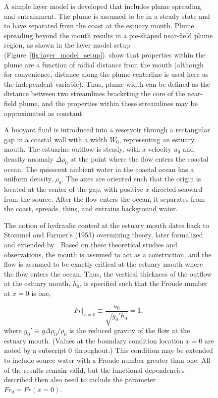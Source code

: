 \documentclass[11pt]{report}
\numberwithin{equation}{section}
\begin{document}
\begin{figure}
A simple layer model is developed that includes plume spreading and entrainment.  The plume is assumed to be in a steady state and to have separated from the coast at the estuary mouth.  Plume spreading beyond the mouth results in a pie-shaped near-field plume region, as shown in the layer model setup (Figure~\ref{fig:layer_model_setup}).  \citet{hetland.macdonald:08} show that properties within the plume are a function of radial distance from the mouth (although for convenience, distance along the plume centerline is used here as the independent variable).  Thus,  plume width can be defined as the distance between two streamlines bracketing the core of the near-field plume, and the properties within these streamlines may be approximated as constant.

A buoyant fluid is introduced into a reservoir through a rectangular gap in a coastal wall with a width $W_0$, representing an estuary mouth.  The estuarine outflow is steady, with a velocity $u_0$ and density anomaly $\Delta\rho_0$ at the point where the flow enters the coastal ocean.  The quiescent ambient water in the coastal ocean has a uniform density, $\rho_0$.  The axes are oriented such that the origin is located at the center of the gap, with positive $x$ directed seaward from the source.  After the flow enters the ocean, it separates from the coast, spreads, thins, and entrains background water.

The notion of hydraulic control at the estuary mouth dates back to Stommel and Farmer's (1953) overmixing theory, later formalized and extended by \citet{armi.farmer:86}.\nocite{stommel.farmer:53}  Based on these theoretical studies and observations, the mouth is assumed to act as a constriction, and the flow is assumed to be exactly critical at the estuary mouth where the flow enters the ocean. Thus, the vertical thickness of the outflow at the estuary mouth, $h_0$, is specified such that the Froude number at $x=0$ is one, 

\begin{equation}
Fr\bigg|_{x=0}\equiv \frac{u_0}{\sqrt{g_0' h_0}} = 1, \label{eq:ic}
\end{equation}
where $g_0' \equiv g \Delta\rho_0 / \rho_0$ is the reduced gravity of the flow at the estuary mouth.  (Values at the boundary condition location $x=0$ are noted by a subscript $0$ throughout.)  This condition may be extended to include source water with a Froude number greater than one.  All of the results remain valid, but the functional dependencies described then also need to include the parameter $Fr_0 = Fr(x=0)$.


\end{figure}
\end{document}
